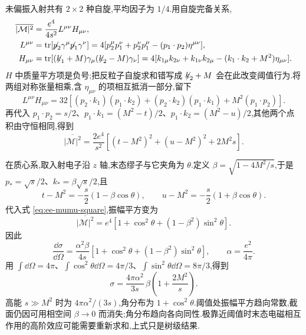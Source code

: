 未偏振入射共有 $2\times2$ 种自旋,平均因子为 $1/4$.用自旋完备关系,
\begin{align}
 \overline{|\mathcal M|^2}
 &=\frac{e^4}{4s^2}L^{\mu\nu}H_{\mu\nu},\\
 L^{\mu\nu}&=\tr[\slashed p_2\gamma^\mu\slashed p_1\gamma^\nu]
 =4[p_2^\mu p_1^\nu+p_2^\nu p_1^\mu-(p_1\cdot p_2)\eta^{\mu\nu}],\\
 H_{\mu\nu}&=\tr[(\slashed k_1+M)\gamma_\mu(\slashed k_2-M)\gamma_\nu]
 =4[k_{1\mu}k_{2\nu}+k_{1\nu}k_{2\mu}
 -(k_1\cdot k_2+M^2)\eta_{\mu\nu}].
\end{align}
$H$ 中质量平方项是负号;把反粒子自旋求和错写成 $\slashed k_2+M$ 会在此改变阈值行为.将两组对称张量相乘,含 $\eta_{\mu\nu}$ 的项相互抵消一部分,留下
\begin{equation}
 L^{\mu\nu}H_{\mu\nu}=32[(p_2\cdot k_1)(p_1\cdot k_2)
 +(p_2\cdot k_2)(p_1\cdot k_1)+M^2(p_1\cdot p_2)].
\end{equation}
再代入 $p_1\cdot p_2=s/2$、$p_1\cdot k_1=(M^2-t)/2$、$p_1\cdot k_2=(M^2-u)/2$,其他两个点积由守恒相同,得到
\begin{equation}
 \overline{|\mathcal M|^2}
 =\frac{2e^4}{s^2}[(t-M^2)^2+(u-M^2)^2+2M^2s].
 \label{eq:ee-mumu-square}
\end{equation}


在质心系,取入射电子沿 $z$ 轴,末态缪子与它夹角为 $\theta$.定义 $\beta=\sqrt{1-4M^2/s}$,于是 $p_*=\sqrt s/2$、$k_*=\beta\sqrt s/2$,且
\begin{equation}
 t-M^2=-\frac s2(1-\beta\cos\theta),
 \qquad u-M^2=-\frac s2(1+\beta\cos\theta).
\end{equation}
代入式 \eqref{eq:ee-mumu-square},振幅平方变为
\begin{equation}
 \overline{|\mathcal M|^2}=e^4[1+\cos^2\theta+(1-\beta^2)\sin^2\theta].
\end{equation}
因此
\begin{equation}
 \frac{\dd\sigma}{\dd\Omega}
 =\frac{\alpha^2\beta}{4s}
 [1+\cos^2\theta+(1-\beta^2)\sin^2\theta],
 \qquad\alpha=\frac{e^2}{4\pi}.
 \label{eq:mumu-angular}
\end{equation}
用 $\int\dd\Omega=4\pi$、$\int\cos^2\theta\dd\Omega=4\pi/3$、$\int\sin^2\theta\dd\Omega=8\pi/3$,得到
\begin{equation}
 \sigma=\frac{4\pi\alpha^2}{3s}\,
 \beta\left(1+\frac{2M^2}{s}\right).
\end{equation}
高能 $s\gg M^2$ 时为 $4\pi\alpha^2/(3s)$,角分布为 $1+\cos^2\theta$.阈值处振幅平方趋向常数,截面仍因可用相空间 $\beta\to0$ 而消失;角分布趋向各向同性.极靠近阈值时末态电磁相互作用的高阶效应可能需要重新求和,上式只是树级结果.

